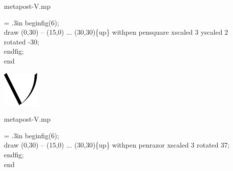 \documentclass[danish,a2paper,22pt]{scrartcl}
\begin{document}
\begin{multicols*}{3}
\begin{spacing}{0.5}
\flushleft
\color{White}
\romansmall
metapost-V.mp\\
\vspace{.4cm}
\color{Black}
\typewritersmall
{\leftskip = .3in
beginfig(6);\\
draw (0,30) -- (15,0) ... (30,30)\fontsize{15pt}{40pt}\{up\} withpen pensquare xscaled 3 yscaled 2 rotated -30;\\
endfig;\\
end
\par}
\vspace{2cm}

\center
\includegraphics[scale=4.5]{metapost-pen/metapost-pen-4.pdf}
\vspace{1cm}

\flushleft
\color{White}
\romansmall
metapost-V.mp\\
\vspace{.4cm}
\color{Black}
\typewritersmall
{\leftskip = .3in
beginfig(6);\\
draw (0,30) -- (15,0) ... (30,30)\fontsize{15pt}{40pt}\{up\} withpen penrazor xscaled 3 rotated 37;\\
endfig;\\
end
\par}
\vspace{2cm}


\end{spacing}
\end{multicols*}
\end{document}
